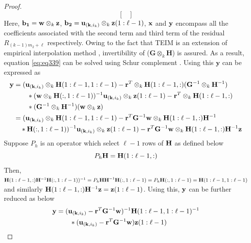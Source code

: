 \documentclass{article}
\begin{document}
\begin{proof}
\begin{equation}
{\begin{bmatrix}
\end{bmatrix}}
\end{equation}
Here, $\bold{b_1}= \bold{w} \otimes_k \bold{z}$, $\bold{b_2}=\bold{u}_{(\bold{k},i_k)} \otimes_k \bold{z}(1:\ell-1)$, $\bold{x}$ and $\bold{y}$  encompass all the coefficients associated with the second term and third term of the residual $R_{(k-1)m_2+\ell}$ respectively. Owing to the fact that TEIM is an extension of empirical interpolation method \cite{EIM}, invertibility of ($\mathbf{G} \otimes_k \mathbf{H}$) is assured. As a result, equation \eqref{eq:eq339} can be solved using Schur complement \cite{boyd2004convex}.  Using this $\mathbf{y}$ can be expressed as
\begin{align*}
   \bold{y} &=(\bold{u}_{(\bold{k},i_k)}\otimes_k \bold{H}(1:\ell-1,1:\ell-1)-\bold{r}^T\otimes_k \bold{H}(1:\ell-1,:)(\bold{G}^{-1}\otimes_k \bold{H}^{-1})\\
  &\quad\quad*(\bold{w} \otimes_k \bold{H}(:,1:\ell-1))^{-1}\bold{u}_{(\bold{k},i_k)}\otimes_k \bold{z}(1:\ell-1)-\bold{r}^T\otimes_k \bold{H}(1:\ell-1,:) \\
 &\quad\quad*(\bold{G}^{-1}\otimes_k \bold{H}^{-1})(\bold{w} \otimes_k \bold{z})\\
 &=(\bold{u}_{(\bold{k},i_k)}\otimes_k \bold{H}(1:\ell-1,1:\ell-1)-\bold{r}^T\bold{G}^{-1}\bold{w}\otimes_k \bold{H}(1:\ell-1,:)\bold{H}^{-1}\\
  &\quad *\bold{H}(:,1:\ell-1))^{-1} \bold{u}_{(\bold{k},i_k)}\otimes_k \bold{z}(1:\ell-1)-\bold{r}^T\bold{G}^{-1}\bold{w}\otimes_k \bold{H}(1:\ell-1,:)\bold{H}^{-1}\bold{z} 
\end{align*}
Suppose $P_h$ is an operator which select $\ell-1$ rows of $\bold{H}$ as defined below
\begin{equation*}
    P_h\bold{H}=\bold{H}(1:\ell-1,:)
\end{equation*}
Then, $\bold{H}(1:\ell-1,:)\bold{H}^{-1}\bold{H}(:,1:\ell-1))^{-1}=P_h\bold{HH}^{-1}\bold{H}(:,1:\ell-1)=P_h\bold{H}(:,1:\ell-1)=\bold{H}(1:\ell-1,1:\ell-1)$ and similarly $\bold{H}(1:\ell-1,:)\bold{H}^{-1}\bold{z}=\bold{z}(1:\ell-1)$. Using this, $\bold{y}$ can be further reduced as below
\begin{equation}\label{eq412}
\begin{split}
\bold{y} &=(\bold{u}_{(\bold{k},i_k)} -\bold{r}^T\bold{G}^{-1}\bold{w})^{-1}\bold{H}(1:\ell-1,1:\ell-1)^{-1}\\
&\quad \quad *(\bold{u}_{(\bold{k},i_k)}-\bold{r}^T\bold{G}^{-1}\bold{w})\bold{z}(1:\ell-1)\\

\end{split}
\end{equation}
\end{proof}
\end{document}
